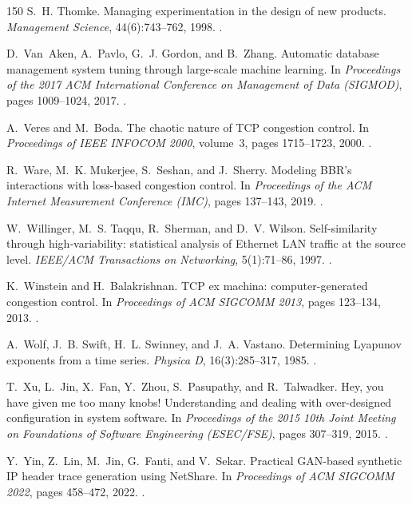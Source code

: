 \begin{thebibliography}{150}
S.~H. Thomke. Managing experimentation in the design of new products. \emph{Management Science}, 44(6):743--762, 1998. .

D.~Van~Aken, A.~Pavlo, G.~J. Gordon, and B.~Zhang. Automatic database management system tuning through large-scale machine learning. In \emph{Proceedings of the 2017 ACM International Conference on Management of Data (SIGMOD)}, pages 1009--1024, 2017. .

A.~Veres and M.~Boda. The chaotic nature of TCP congestion control. In \emph{Proceedings of IEEE INFOCOM 2000}, volume~3, pages 1715--1723, 2000. .

R.~Ware, M.~K. Mukerjee, S.~Seshan, and J.~Sherry. Modeling BBR's interactions with loss-based congestion control. In \emph{Proceedings of the ACM Internet Measurement Conference (IMC)}, pages 137--143, 2019. .

W.~Willinger, M.~S. Taqqu, R.~Sherman, and D.~V. Wilson. Self-similarity through high-variability: statistical analysis of Ethernet LAN traffic at the source level. \emph{IEEE/ACM Transactions on Networking}, 5(1):71--86, 1997. .

K.~Winstein and H.~Balakrishnan. TCP ex machina: computer-generated congestion control. In \emph{Proceedings of ACM SIGCOMM 2013}, pages 123--134, 2013. .

A.~Wolf, J.~B. Swift, H.~L. Swinney, and J.~A. Vastano. Determining Lyapunov exponents from a time series. \emph{Physica D}, 16(3):285--317, 1985. .

T.~Xu, L.~Jin, X.~Fan, Y.~Zhou, S.~Pasupathy, and R.~Talwadker. Hey, you have given me too many knobs! Understanding and dealing with over-designed configuration in system software. In \emph{Proceedings of the 2015 10th Joint Meeting on Foundations of Software Engineering (ESEC/FSE)}, pages 307--319, 2015. .

Y.~Yin, Z.~Lin, M.~Jin, G.~Fanti, and V.~Sekar. Practical GAN-based synthetic IP header trace generation using NetShare. In \emph{Proceedings of ACM SIGCOMM 2022}, pages 458--472, 2022. .


\end{thebibliography}
